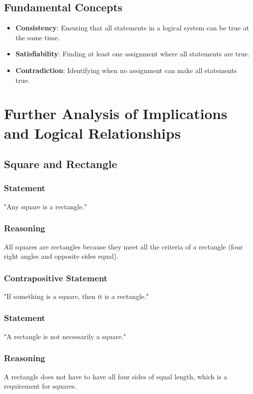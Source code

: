 \documentclass{article}
\begin{document}
\subsection{Fundamental Concepts}
\begin{itemize}
    \item \textbf{Consistency}: Ensuring that all statements in a logical system can be true at the same time.
    \item \textbf{Satisfiability}: Finding at least one assignment where all statements are true.
    \item \textbf{Contradiction}: Identifying when no assignment can make all statements true.
\end{itemize}

\section{Further Analysis of Implications and Logical Relationships}

\subsection{Square and Rectangle}

\subsubsection{Statement}
"Any square is a rectangle."

\subsubsection{Reasoning}
All squares are rectangles because they meet all the criteria of a rectangle (four right angles and opposite sides equal).

\subsubsection{Contrapositive Statement}
"If something is a square, then it is a rectangle."

\subsubsection{Statement}
"A rectangle is not necessarily a square."

\subsubsection{Reasoning}
A rectangle does not have to have all four sides of equal length, which is a requirement for squares.
\end{document}
